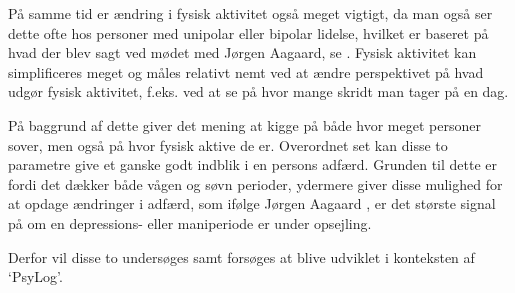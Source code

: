 På samme tid er ændring i fysisk aktivitet også meget vigtigt, da man også ser dette ofte hos personer med unipolar eller bipolar lidelse, hvilket er baseret på hvad der blev sagt ved mødet med Jørgen Aagaard, se \citep[Kapitel 1, Sektion 4]{misc:faellesrapp}. 
Fysisk aktivitet kan simplificeres meget og måles relativt nemt ved at ændre perspektivet på hvad udgør fysisk aktivitet, f.eks. ved at se på hvor mange skridt man tager på en dag.

På baggrund af dette giver det mening at kigge på både hvor meget personer sover, men også på hvor fysisk aktive de er.
Overordnet set kan disse to parametre give et ganske godt indblik i en persons adfærd.
Grunden til dette er fordi det dækker både vågen og søvn perioder, ydermere giver disse mulighed for at opdage ændringer i adfærd, som ifølge Jørgen Aagaard \citep[Kapitel 1, Sektion 4]{misc:faellesrapp}, er det største signal på om en depressions- eller maniperiode er under opsejling. 

Derfor vil disse to undersøges samt forsøges at blive udviklet i konteksten af `PsyLog'.